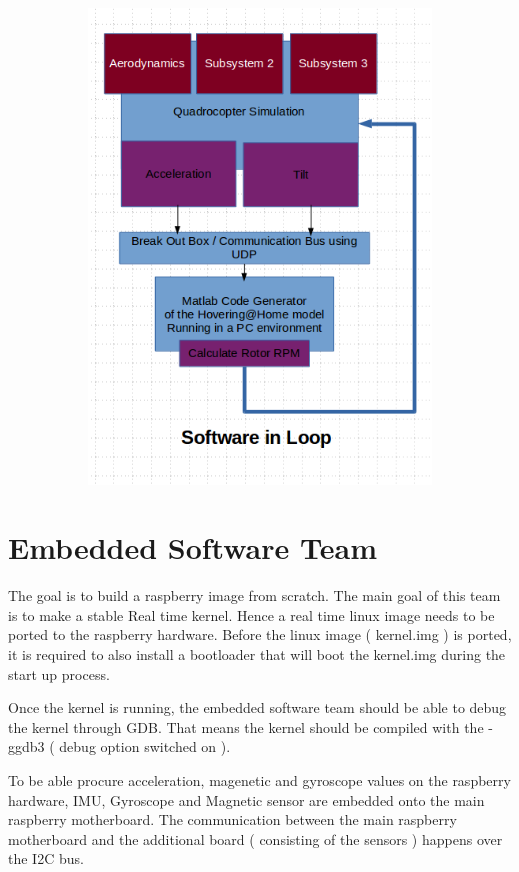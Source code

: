 \documentclass[a4paper,11pt]{article}
\begin{document}
\begin{figure}[ht]
\begin{subfigure}{1\textwidth}
\includegraphics[scale=0.5]{pics/Control2.png}
\end{subfigure}
\end{figure}
 
\pagebreak

\section{Embedded Software Team}

The goal is to build a raspberry image from scratch.
The main goal of this team is to make a stable Real time kernel. Hence a real time linux image needs to be ported to the raspberry hardware. Before the linux image ( kernel.img ) is ported, it is required to also install a bootloader that will boot the kernel.img during the start up process. 

Once the kernel is running, the embedded software team should be able to debug the kernel through GDB. That means the kernel should be compiled with the -ggdb3 ( debug option switched on ).

To be able procure acceleration, magenetic and gyroscope values on the raspberry hardware, IMU, Gyroscope and Magnetic sensor are embedded onto the main raspberry motherboard. The communication between the main raspberry motherboard and the additional board ( consisting of the sensors ) happens over the I2C bus. 
\end{document}
